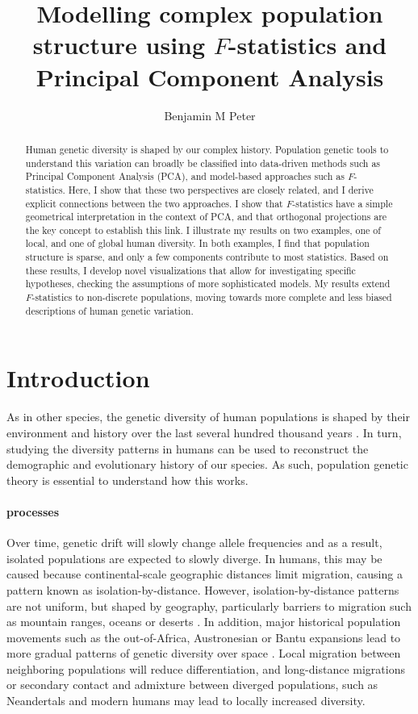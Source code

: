 \documentclass[12pt,fullpage, a4paper]{article}
\title{Modelling complex population structure using $F$-statistics and Principal Component Analysis}
\author{Benjamin M Peter}
\begin{document}
	\maketitle
\begin{abstract}
Human  genetic diversity is shaped by our complex history. Population genetic tools to understand this variation can broadly be classified into data-driven methods such as Principal Component Analysis (PCA), and model-based approaches such as $F$-statistics.
Here, I show that these two perspectives are closely related, and I derive explicit connections between the two approaches. I show that $F$-statistics have a simple geometrical interpretation in the context of PCA, and that orthogonal projections are the key concept to establish this link. I illustrate my results on two examples, one of local, and one of global human diversity. In both examples, I find that population structure is sparse, and only a few components contribute to most statistics. Based on these results, I develop novel visualizations that allow for investigating specific hypotheses, checking the assumptions of more sophisticated models. My results extend $F$-statistics to non-discrete populations, moving towards more complete and less biased descriptions of human genetic variation.
\end{abstract}
\section{Introduction}
As in other species, the genetic diversity of human populations  is shaped by their environment and history over the last several hundred thousand years \citep[e.g][]{cavalli-sforza1994, schraiber2015}. In turn, studying the diversity patterns in humans can be used to reconstruct the demographic and evolutionary history of our species. As such, population genetic theory is essential to understand how this works. 

\paragraph{processes}
Over time, genetic drift will slowly change allele frequencies and as a result, isolated populations are expected to slowly diverge. In humans, this may be caused because continental-scale geographic distances limit migration, causing a pattern known as isolation-by-distance. However, isolation-by-distance patterns are not uniform, but shaped by geography, particularly barriers   to migration such as mountain ranges, oceans or deserts \citep{bradburd2013, peter2020a, rosenberg2005}. In addition,  major historical population movements such as the out-of-Africa, Austronesian or Bantu expansions lead to more gradual patterns of genetic diversity over space \citep{cavalli-sforza1994, ramachandran2005, novembre2008, peter2020a, stoneking2016, racimo2020}. Local migration between neighboring populations will reduce differentiation, and long-distance migrations \citep{alves2016} or secondary contact and admixture between diverged populations, such as Neandertals and modern humans \citep{green2010} may lead to locally increased diversity.
\end{document}
